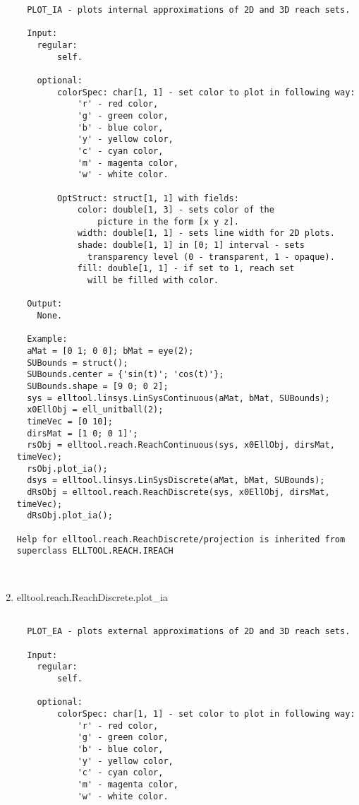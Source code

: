 \begin{enumerate}
\begin{lstlisting}
  PLOT_IA - plots internal approximations of 2D and 3D reach sets.

  Input:
    regular:
        self.

    optional:
        colorSpec: char[1, 1] - set color to plot in following way:
            'r' - red color,
            'g' - green color,
            'b' - blue color,
            'y' - yellow color,
            'c' - cyan color,
            'm' - magenta color,
            'w' - white color.

        OptStruct: struct[1, 1] with fields:
            color: double[1, 3] - sets color of the
                picture in the form [x y z].
            width: double[1, 1] - sets line width for 2D plots.
            shade: double[1, 1] in [0; 1] interval - sets
              transparency level (0 - transparent, 1 - opaque).
            fill: double[1, 1] - if set to 1, reach set
              will be filled with color.

  Output:
    None.

  Example:
  aMat = [0 1; 0 0]; bMat = eye(2);
  SUBounds = struct();
  SUBounds.center = {'sin(t)'; 'cos(t)'};
  SUBounds.shape = [9 0; 0 2];
  sys = elltool.linsys.LinSysContinuous(aMat, bMat, SUBounds);
  x0EllObj = ell_unitball(2);
  timeVec = [0 10];
  dirsMat = [1 0; 0 1]';
  rsObj = elltool.reach.ReachContinuous(sys, x0EllObj, dirsMat, timeVec);
  rsObj.plot_ia();
  dsys = elltool.linsys.LinSysDiscrete(aMat, bMat, SUBounds);
  dRsObj = elltool.reach.ReachDiscrete(sys, x0EllObj, dirsMat, timeVec);
  dRsObj.plot_ia();

Help for elltool.reach.ReachDiscrete/projection is inherited from superclass ELLTOOL.REACH.IREACH



\end{lstlisting}
\fontfamily{\familydefault}
\selectfont
\item {elltool.reach.ReachDiscrete.plot\_ia}
\selectfont
\begin{lstlisting}

  PLOT_EA - plots external approximations of 2D and 3D reach sets.

  Input:
    regular:
        self.

    optional:
        colorSpec: char[1, 1] - set color to plot in following way:
            'r' - red color,
            'g' - green color,
            'b' - blue color,
            'y' - yellow color,
            'c' - cyan color,
            'm' - magenta color,
            'w' - white color.


\end{lstlisting}
\end{enumerate}
